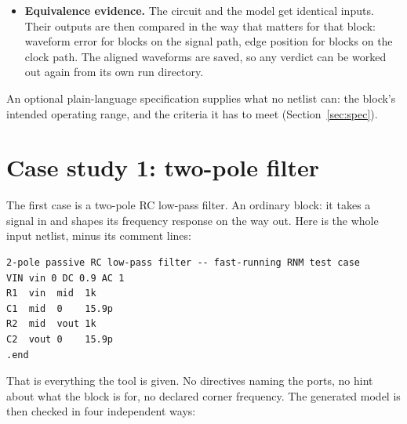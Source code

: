 \documentclass[11pt,a4paper]{article}
\begin{document}
\begin{itemize}[leftmargin=1.5em,itemsep=0.3em]
        The environment instantiates the model itself, not a copy
        behind a wrapper, so the checks cover exactly what ships. The
        environment's own structure is IEEE 1800 throughout: the
        nettype, the resolution function and the \texttt{interconnect}
        ports. The model it drives has \texttt{wreal} ports, though,
        so running it does need a simulator that supports
        \texttt{wreal}.

        Bridge and wrapper ports are \texttt{interconnect} (\S6.6.8),
        so they take on the testbench's nettype instead of naming one.
        And the scoreboard's golden values are SPICE measurements of
        your circuit.
  \item \textbf{Equivalence evidence.} The circuit and the model get
        identical inputs. Their outputs are then compared in the way
        that matters for that block: waveform error for blocks on the
        signal path, edge position for blocks on the clock path. The
        aligned waveforms are saved, so any verdict can be worked out
        again from its own run directory.
\end{itemize}

\noindent An optional plain-language specification supplies what no
netlist can: the block's intended operating range, and the criteria it
has to meet (Section~\ref{sec:spec}).

\section{Case study 1: two-pole filter}

The first case is a two-pole RC low-pass filter. An ordinary block:
it takes a signal in and shapes its frequency response on the way out.
Here is the whole input netlist, minus its comment lines:

\begin{lstlisting}
2-pole passive RC low-pass filter -- fast-running RNM test case
VIN vin 0 DC 0.9 AC 1
R1  vin  mid  1k
C1  mid  0    15.9p
R2  mid  vout 1k
C2  vout 0    15.9p
.end
\end{lstlisting}

\noindent That is everything the tool is given. No directives naming
the ports, no hint about what the block is for, no declared corner
frequency. The generated model is then checked in four independent
ways:
\end{document}
